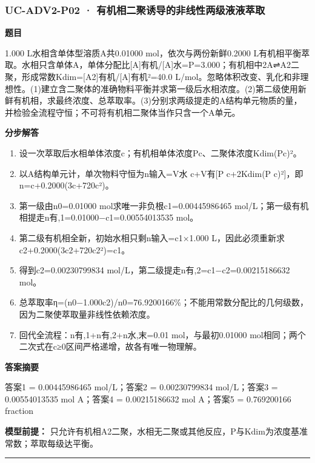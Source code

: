 \documentclass[UTF8,11pt,a4paper]{ctexart}
\begin{document}
\subsubsection*{UC-ADV2-P02 · 有机相二聚诱导的非线性两级液液萃取}
\noindent\textbf{题目}\par
1.000 L水相含单体型溶质A共0.01000 mol，依次与两份新鲜0.2000 L有机相平衡萃取。水相只含单体A，单体分配比[A]有机/[A]水=P=3.000；有机相中2A⇌A2二聚，形成常数Kdim=[A2]有机/[A]有机²=40.0 L/mol。忽略体积改变、乳化和非理想性。(1)建立含二聚体的准确物料平衡并求第一级后水相浓度。(2)第二级使用新鲜有机相，求最终浓度、总萃取率。(3)分别求两级提走的A结构单元物质的量，并检验全流程守恒；不可将有机相二聚体当作只含一个A单元。\par
\medskip\noindent\textbf{分步解答}
\begin{enumerate}
\item 设一次萃取后水相单体浓度c；有机相单体浓度Pc、二聚体浓度Kdim(Pc)²。
\item 以A结构单元计，单次物料守恒为n输入=V水 c+V有[P c+2Kdim(P c)²]，即n=c+0.2000(3c+720c²)。
\item 第一级由n0=0.01000 mol求唯一非负根c1=0.00445986465 mol/L；第一级有机相提走n有,1=0.01000−c1=0.00554013535 mol。
\item 第二级有机相全新，初始水相只剩n输入=c1×1.000 L，因此必须重新求c2+0.2000(3c2+720c2²)=c1。
\item 得到c2=0.00230799834 mol/L，第二级提走n有,2=c1−c2=0.00215186632 mol。
\item 总萃取率η=(n0−1.000c2)/n0=76.9200166\%；不能用常数分配比的几何级数，因为二聚使萃取量非线性依赖浓度。
\item 回代全流程：n有,1+n有,2+n水,末=0.01 mol，与最初0.01000 mol相同；两个二次式在c≥0区间严格递增，故各有唯一物理解。
\end{enumerate}
\noindent\textbf{答案摘要}\par
答案1 = 0.00445986465 mol/L；答案2 = 0.00230799834 mol/L；答案3 = 0.00554013535 mol A；答案4 = 0.00215186632 mol A；答案5 = 0.769200166 fraction\par
\noindent\textbf{模型前提：}
只允许有机相A2二聚，水相无二聚或其他反应，P与Kdim为浓度基准常数；萃取每级达平衡。\par
\medskip\hrule\medskip
{}
\end{document}
